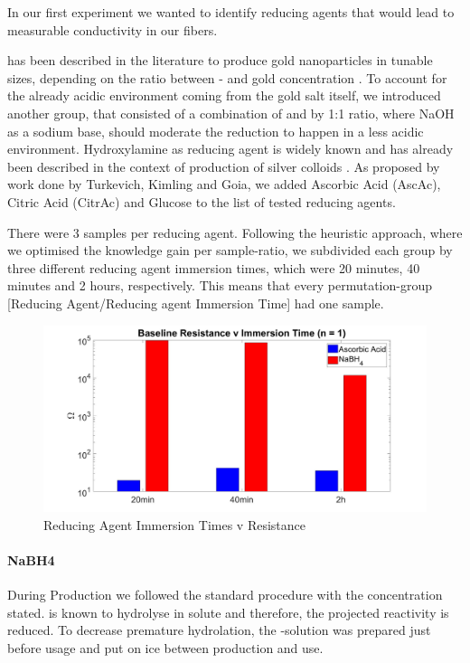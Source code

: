 In our first experiment we wanted to identify reducing agents that would lead to measurable conductivity in our fibers.

 has been described in the literature to produce gold nanoparticles in tunable sizes, depending on the ratio between - and gold concentration \cite{NaBH4UsedForGoldNP}. 	 To account for the already acidic environment coming from the gold salt itself, we introduced another group, that consisted of a combination of  and  by 1:1 ratio, where NaOH as a sodium base, should moderate the reduction to happen in a less acidic environment.
Hydroxylamine as reducing agent is widely known and has already been described in the context of production of silver colloids \cite{Leopold}.  
As proposed by work done by Turkevich, Kimling and Goia, we added Ascorbic Acid (AscAc)\cite{Frens}, Citric Acid (CitrAc)\cite{Kimling} and Glucose \cite{Goia} to the list of tested reducing agents.

There were 3 samples per reducing agent. Following the heuristic approach, where we optimised the knowledge gain per sample-ratio, we subdivided each group by three different reducing agent immersion times, which were 20 minutes, 40 minutes and 2 hours, respectively. This means that every permutation-group [Reducing Agent/Reducing agent Immersion Time] had one sample.


\begin{figure}[H]
	\centerline{\includegraphics[width=1.2\textwidth]{./pic/tRedVR0.jpg}}
	\caption{Reducing Agent Immersion Times v Resistance}
	\label{fig:R0VtRed}
\end{figure}


\paragraph{NaBH4}
During Production we followed the standard procedure with the concentration stated.  is known to hydrolyse in solute and therefore, the projected reactivity is reduced. To decrease premature hydrolation, the -solution was prepared just before usage and put on ice between production and use.\\

